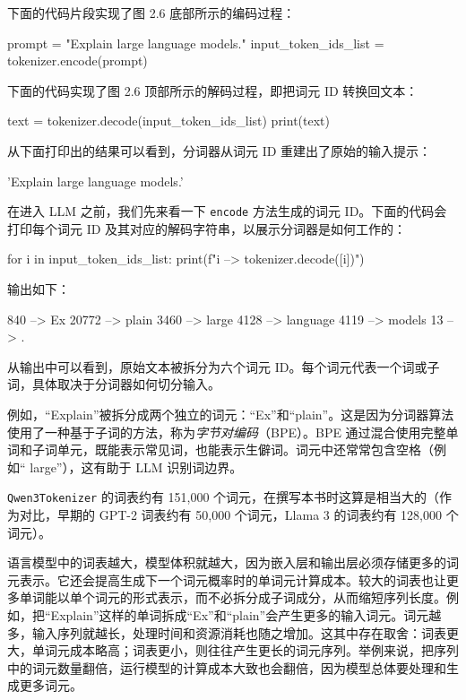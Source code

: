 下面的代码片段实现了图 2.6 底部所示的编码过程：

\begin{codebox}
prompt = "Explain large language models."
input_token_ids_list = tokenizer.encode(prompt)
\end{codebox}

下面的代码实现了图 2.6 顶部所示的解码过程，即把词元 ID 转换回文本：

\begin{codebox}
text = tokenizer.decode(input_token_ids_list)
print(text)
\end{codebox}

从下面打印出的结果可以看到，分词器从词元 ID 重建出了原始的输入提示：

\begin{codebox}
'Explain large language models.'
\end{codebox}

在进入 LLM 之前，我们先来看一下 \texttt{encode} 方法生成的词元 ID。下面的代码会打印每个词元 ID 及其对应的解码字符串，以展示分词器是如何工作的：

\begin{codebox}
for i in input_token_ids_list:
    print(f"{i} --> {tokenizer.decode([i])}")
\end{codebox}

输出如下：

\begin{codebox}
840 --> Ex
20772 --> plain
3460 -->  large
4128 -->  language
4119 -->  models
13 --> .
\end{codebox}

从输出中可以看到，原始文本被拆分为六个词元 ID。每个词元代表一个词或子词，具体取决于分词器如何切分输入。

例如，“Explain”被拆分成两个独立的词元：“Ex”和“plain”。这是因为分词器算法使用了一种基于子词的方法，称为\emph{字节对}\emph{编码}（BPE）。BPE 通过混合使用完整单词和子词单元，既能表示常见词，也能表示生僻词。词元中还常常包含空格（例如“ large”），这有助于 LLM 识别词边界。

\texttt{Qwen3Tokenizer} 的词表约有 151,000 个词元，在撰写本书时这算是相当大的（作为对比，早期的 GPT-2 词表约有 50,000 个词元，Llama 3 的词表约有 128,000 个词元）。

语言模型中的词表越大，模型体积就越大，因为嵌入层和输出层必须存储更多的词元表示。它还会提高生成下一个词元概率时的单词元计算成本。较大的词表也让更多单词能以单个词元的形式表示，而不必拆分成子词成分，从而缩短序列长度。例如，把“Explain”这样的单词拆成“Ex”和“plain”会产生更多的输入词元。词元越多，输入序列就越长，处理时间和资源消耗也随之增加。这其中存在取舍：词表更大，单词元成本略高；词表更小，则往往产生更长的词元序列。举例来说，把序列中的词元数量翻倍，运行模型的计算成本大致也会翻倍，因为模型总体要处理和生成更多词元。

